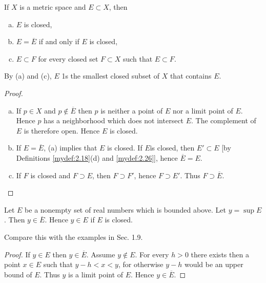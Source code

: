 \begin{thm}
    \label{thm:2.27}
    If $X$ is a metric space and $E \subset X$, then
    \begin{enumerate}[(a)]
        \item $E$ is closed,
        \item $E = \overline{E}$ if and only if $E$ is closed,
        \item $E \subset F$ for every closed set $F \subset X$ such that $E \subset F$.
    \end{enumerate}
\end{thm}
By (a) and (c), $E$ 1s the smallest closed subset of $X$ that contains $E$.
\begin{proof}
    \begin{enumerate}[(a)]
        \item If $p \in X$ and $p \not\in \overline{E}$ then $p$ is neither a point of $E$ nor a limit point of $E$. Hence $p$ has a neighborhood which does not intersect $E$. The complement of $E$ is therefore open. Hence $E$ is closed.
        \item If $E = \overline{E}$, (a) implies that $E$ is closed. If $E$is closed, then $E' \subset E$ [by Definitions \ref{mydef:2.18}(d) and \ref{mydef:2.26}], hence $\overline{E} = E$.
        \item If $F$ is closed and $F \supset E$, then $F \supset F'$, hence $F \supset E'$. Thus $F \supset \overline{E}$.
    \end{enumerate}
\end{proof}


\begin{thm}
    \label{thm:2.28}
    Let $E$ be a nonempty set of real numbers which is bounded above.     Let $y = \sup E$. Then $y \in \overline{E}$. Hence $y \in E$ if $E$ is closed.
\end{thm}
Compare this with the examples in Sec. 1.9.
\begin{proof}
    If $y \in E$ then $y \in \overline{E}$. 
    Assume $y \not\in E$. 
    For every $h > 0$ there exists then a point $x \in E$ 
    such that $y - h < x < y$, 
    for otherwise $y - h$ would be an upper bound of $E$. 
    Thus $y$ is a limit point of $E$. Hence $y \in \overline{E}$.
\end{proof}

